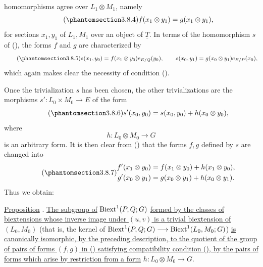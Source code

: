homomorphisms agree over $L_1\otimes M_1$, namely
\begin{equation}\tag{\SGARefTarget{sga7.sga7i.evii.n3-8-4}{3.8.4}}
 f(x_1\otimes y_1)=g(x_1\otimes y_1),
\end{equation}
for sections $x_1,y_1$ of $L_1,M_1$ over an object of
$\underline T$.  In terms of the homomorphism $s$ of (), the
forms $f$ and $g$ are characterized by
\begin{equation}\tag{\SGARefTarget{sga7.sga7i.evii.n3-8-5}{3.8.5}}
 s(x_1,y_0)=f(x_1\otimes y_0)e_{E/Q}(y_0),\qquad
 s(x_0,y_1)=g(x_0\otimes y_1)e_{E/P}(x_0),
\end{equation}
which again makes clear the necessity of condition ().

Once the trivialization $s$ has been chosen, the other
trivializations are the morphisms
$s':L_0\times M_0\longrightarrow E$ of the form
\begin{equation}\tag{\SGARefTarget{sga7.sga7i.evii.n3-8-6}{3.8.6}}
 s'(x_0,y_0)=s(x_0,y_0)+h(x_0\otimes y_0),
\end{equation}
where
\[
 h:L_0\otimes M_0\longrightarrow G
\]
is an arbitrary form.  It is then clear from () that the forms
$f,g$ defined by $s$ are changed into
\begin{equation}\tag{\SGARefTarget{sga7.sga7i.evii.n3-8-7}{3.8.7}}
\begin{aligned}
 f'(x_1\otimes y_0)&=f(x_1\otimes y_0)+h(x_1\otimes y_0),\\
 g'(x_0\otimes y_1)&=g(x_0\otimes y_1)+h(x_0\otimes y_1).
\end{aligned}
\end{equation}
Thus we obtain:

\underline{Proposition} .
\underline{The subgroup of} $\operatorname{Biext}^1(P,Q;G)$ \underline{formed by the classes
of biextensions whose inverse image under $(u,v)$ is a trivial
biextension of $(L_0,M_0)$} (that is, the kernel of
$\operatorname{Biext}^1(P,Q;G)\longrightarrow\operatorname{Biext}^1(L_0,M_0;G)$)
\underline{is canonically isomorphic, by the preceding description,
to the quotient of the group of pairs of forms $(f,g)$ in ()
satisfying compatibility condition (), by the pairs of forms
which arise by restriction from a form}
$h:L_0\otimes M_0\longrightarrow G$.

